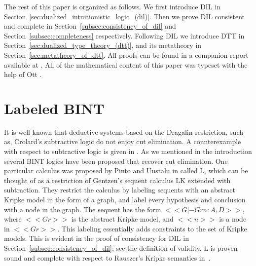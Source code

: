 The rest of this paper is organized as follows.  We first introduce
DIL in Section~\ref{sec:dualized_intuitionistic_logic_(dil)}. Then we
prove DIL consistent and complete in
Section~\ref{subsec:consistency_of_dil} and
Section~\ref{subsec:completeness} respectively.  Following DIL we
introduce DTT in Section~\ref{sec:dualized_type_theory_(dtt)}, and its
metatheory in Section~\ref{sec:metatheory_of_dtt}.  All proofs can be
found in a companion report available at \cite{Eades:2014}.  All of
the mathematical content of this paper was typeset with the help of
Ott \cite{Sewell:2010}.

\section{Labeled BINT}
\label{sec:L}

It is well known that deductive systems based on the Dragalin
restriction, such as, Crolard's subtractive logic do not enjoy cut
elimination.  A counterexample with respect to subtractive logic is
given in \cite{Pinto:2009}.  As we mentioned in the introduction
several BINT logics have been proposed that recover cut elimination.
One particular calculus was proposed by Pinto and Uustalu in
\cite{Pinto:2009} called L, which can be thought of as a restriction
of Gentzen's sequent calculus LK extended with subtraction.  They
restrict the calculus by labeling sequents with an abstract Kripke
model in the form of a graph, and label every hypothesis and
conclusion with a node in the graph.  The sequent has the form $<<G |-
Gr n : A,D>>$, where $<<Gr>>$ is the abstract Kripke model, and
$<<n>>$ is a node in $<<Gr>>$.  This labeling essentially adds
constraints to the set of Kripke models.  This is evident in the proof
of consistency for DIL in Section~\ref{subsec:consistency_of_dil}; see
the definition of validity.  L is proven sound and complete with
respect to Rauszer's Kripke semantics in~\cite{Pinto:2009}.


